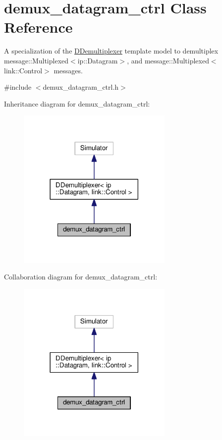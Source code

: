 \hypertarget{classdemux__datagram__ctrl}{}\section{demux\+\_\+datagram\+\_\+ctrl Class Reference}
\label{classdemux__datagram__ctrl}


A specialization of the \hyperlink{classDDemultiplexer}{D\+Demultiplexer} template model to demultiplex message\+::\+Multiplexed$<$ip\+::\+Datagram$>$, and message\+::\+Multiplexed$<$link\+::\+Control$>$ messages.  




{\ttfamily \#include $<$demux\+\_\+datagram\+\_\+ctrl.\+h$>$}



Inheritance diagram for demux\+\_\+datagram\+\_\+ctrl\+:\nopagebreak
\begin{figure}[H]
\begin{center}
\leavevmode
\includegraphics[width=213pt]{classdemux__datagram__ctrl__inherit__graph}
\end{center}
\end{figure}


Collaboration diagram for demux\+\_\+datagram\+\_\+ctrl\+:\nopagebreak
\begin{figure}[H]
\begin{center}
\leavevmode
\includegraphics[width=213pt]{classdemux__datagram__ctrl__coll__graph}
\end{center}
\end{figure}
